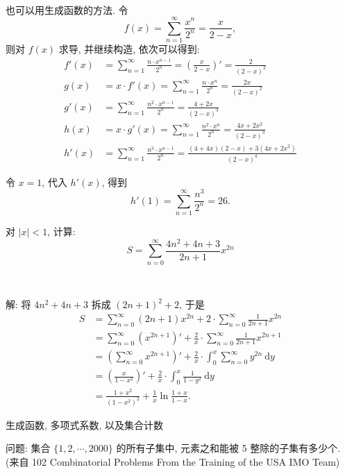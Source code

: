 ~

\noindent 也可以用生成函数的方法. 令 
\[f(x) =  \sum_{n=1}^{\infty}{\frac{x^n}{2^n}} = \frac{x}{2-x} ,\]
则对 $f(x)$ 求导, 并继续构造, 依次可以得到:
\begin{align*}
f'(x) &=  \sum_{n=1}^{\infty}{\frac{n\cdot x^{n-1}}{2^n}} = \left( \frac{x}{2-x} \right)' = \frac{2}{(2-x)^2} \\
g(x) &= x\cdot f'(x) = \sum_{n=1}^{\infty}{\frac{n\cdot x^n}{2^n}} = \frac{2x}{(2-x)^2} \\
g'(x) &= \sum_{n=1}^{\infty}{\frac{n^2 \cdot x^{n-1}}{2^n}} = \frac{4+2x}{(2-x)^3} \\
h(x) &= x\cdot g'(x) = \sum_{n=1}^{\infty}{\frac{n^2\cdot x^n}{2^n}} = \frac{4x+2x^2}{(2-x)^3} \\
h'(x) &= \sum_{n=1}^{\infty}{\frac{n^3\cdot x^{n-1}}{2^n}} = \frac{(4+4x)(2-x)+3(4x+2x^2)}{(2-x)^4}
\end{align*}

令 $x=1$, 代入 $h'(x)$, 得到
\[h'(1) = \sum_{n=1}^{\infty}{\frac{n^3}{2^n}} = 26 .\]


\newpage
对 $|x| < 1$, 计算:
\[S = \sum_{n=0}^{\infty}\frac{4n^2+4n+3}{2n+1}x^{2n}\]

~

解: 将 $4n^2 + 4n + 3$ 拆成 $(2n+1)^2 + 2$, 于是
\begin{align*}
S &= \sum_{n=0}^{\infty}(2n+1)x^{2n} + 2\cdot\sum_{n=0}^{\infty}\frac{1}{2n+1}x^{2n}\\
&= \sum_{n=0}^{\infty}\left(x^{2n+1}\right)' + \frac{2}{x}\cdot\sum_{n=0}^{\infty}\frac{1}{2n+1}x^{2n+1}\\
&= \left(\sum_{n=0}^{\infty}x^{2n+1}\right)' + \frac{2}{x}\cdot\int_0^x\sum_{n=0}^\infty y^{2n}\ \mathrm{d}y \\
&= \left(\frac{x}{1-x^2}\right)' + \frac{2}{x}\cdot\int_0^x\frac{1}{1-y^2}\ \mathrm{d}y\\
&= \frac{1+x^2}{(1-x^2)^2} + \frac{1}{x}\ln\frac{1+x}{1-x} .
\end{align*}



\newpage

\noindent 生成函数, 多项式系数, 以及集合计数

\noindent 问题: 集合 $\{1,2,\cdots ,2000\}$ 的所有子集中, 元素之和能被 5 整除的子集有多少个. (来自 102 Combinatorial Problems From the Training of the USA IMO Team)

